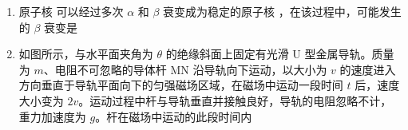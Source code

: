 \documentclass[\gkver]{gaokaozhenti}
\begin{document}
\begin{enumerate}
{故 A 错误；

B．根据折射定律
$n=\frac{\sin i}{\sin r}$

a、b 光以相同的入射角由水斜射入空气，a 光的折射角比 b 光的大，则
$n_{a}>n_{b}$

根据光在介质中的传播速度与折射率的关系
$n=\frac{c}{v}$

可得在水中传播时，a 光的速度比 b 光的小，故 B 错误；

C．在水中传播时，a 光的折射率比 b 光的大，所以 a 光的频率比 b 光的大，故 C 错误；

D．根据临界角与折射率的关系
$n=\frac{1}{\sin C}$

可得在水中传播时，a 光的折射率比 b 光的大，a 光的全反射临界角比 b 光的小，故 D 正确。

故选 D。
}

\item
原子核  可以经过多次 $\alpha$ 和 $\beta$ 衰变成为稳定的原子核 ，在该过程中，可能发生的 $\beta$ 衰变是

{}
{}
{}


\item
如图所示，与水平面夹角为 $\theta$ 的绝缘斜面上固定有光滑 U 型金属导轨。质量为 $m$、电阻不可忽略的导体杆 MN 沿导轨向下运动，以大小为 $v$ 的速度进入方向垂直于导轨平面向下的匀强磁场区域，在磁场中运动一段时间 $t$ 后，速度大小变为 $2v$。运动过程中杆与导轨垂直并接触良好，导轨的电阻忽略不计，重力加速度为 $g$。杆在磁场中运动的此段时间内


\end{enumerate}
\end{document}
